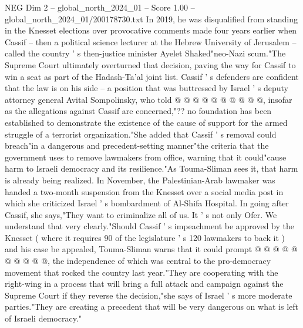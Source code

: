 \begin{textsample}{NEG Dim 2 – global\_north\_2024\_01 – Score 1.00 – global\_north\_2024\_01/200178730.txt}
In 2019, he was disqualified from standing in the Knesset elections over provocative comments made four years earlier when Cassif -- then a political science lecturer at the Hebrew University of Jerusalem -- called the country ' s then-justice minister Ayelet Shaked"neo-Nazi scum."The Supreme Court ultimately overturned that decision, paving the way for Cassif to win a seat as part of the Hadash-Ta'al joint list.
Cassif ' s defenders are confident that the law is on his side -- a position that was buttressed by Israel ' s deputy attorney general Avital Sompolinsky, who told @ @ @ @ @ @ @ @ @ @, insofar as the allegations against Cassif are concerned,"?? no foundation has been established to demonstrate the existence of the cause of support for the armed struggle of a terrorist organization."She added that Cassif ' s removal could breach"in a dangerous and precedent-setting manner"the criteria that the government uses to remove lawmakers from office, warning that it could"cause harm to Israeli democracy and its resilience."As Touma-Sliman sees it, that harm is already being realized.
In November, the Palestinian-Arab lawmaker was handed a two-month suspension from the Knesset over a social media post in which she criticized Israel ' s bombardment of Al-Shifa Hospital.
In going after Cassif, she says,"They want to criminalize all of us.
It ' s not only Ofer.
We understand that very clearly."Should Cassif ' s impeachment be approved by the Knesset ( where it requires 90 of the legislature ' s 120 lawmakers to back it ) and his case be appealed, Touma-Sliman warns that it could prompt @ @ @ @ @ @ @ @ @ @, the independence of which was central to the pro-democracy movement that rocked the country last year."They are cooperating with the right-wing in a process that will bring a full attack and campaign against the Supreme Court if they reverse the decision,"she says of Israel ' s more moderate parties."They are creating a precedent that will be very dangerous on what is left of Israeli democracy."

\end{textsample}
